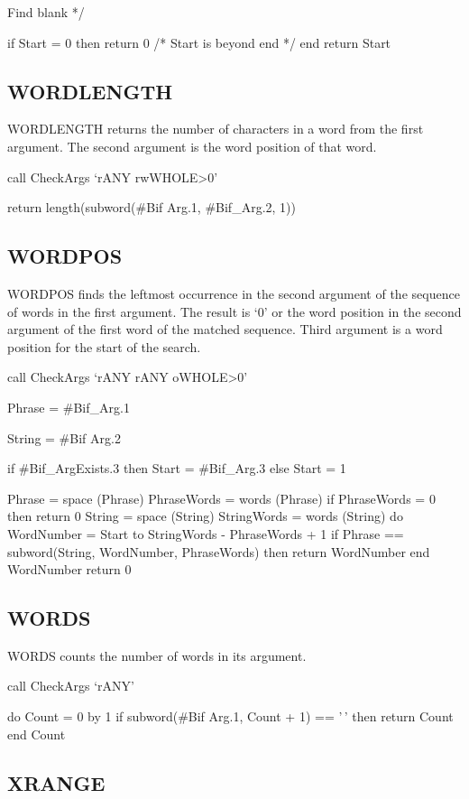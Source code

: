 Find blank */

if Start = 0 then return 0 /* Start is beyond end */ end return Start

\subsection{WORDLENGTH}\label{wordlength}

WORDLENGTH returns the number of characters in a word from the first
argument. The second argument is the word position of that word.

call CheckArgs `rANY rwWHOLE\textgreater0'

return length(subword(\#Bif Arg.1, \#Bif\_Arg.2, 1))

\subsection{WORDPOS}\label{wordpos}

WORDPOS finds the leftmost occurrence in the second argument of the
sequence of words in the first argument. The result is `0' or the word
position in the second argument of the first word of the matched
sequence. Third argument is a word position for the start of the search.

call CheckArgs `rANY rANY oWHOLE\textgreater0'

Phrase = \#Bif\_Arg.1

String = \#Bif Arg.2

if \#Bif\_ArgExists.3 then Start = \#Bif\_Arg.3 else Start = 1

Phrase = space (Phrase) PhraseWords = words (Phrase) if PhraseWords = 0
then return 0 String = space (String) StringWords = words (String) do
WordNumber = Start to StringWords - PhraseWords + 1 if Phrase ==
subword(String, WordNumber, PhraseWords) then return WordNumber end
WordNumber return 0

\subsection{WORDS}\label{words}

WORDS counts the number of words in its argument.

call CheckArgs `rANY'

do Count = 0 by 1 if subword(\#Bif Arg.1, Count + 1) == '\,' then return
Count end Count

\subsection{XRANGE}\label{xrange}

